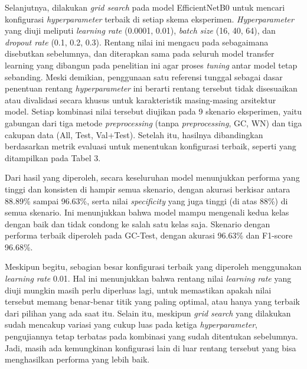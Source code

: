 Selanjutnya, dilakukan \textit{grid search} pada model EfficientNetB0 untuk mencari konfigurasi \textit{hyperparameter} terbaik di setiap skema eksperimen. \textit{Hyperparameter} yang diuji meliputi \textit{learning rate} (0.0001, 0.01), \textit{batch size} (16, 40, 64), dan \textit{dropout rate} (0.1, 0.2, 0.3). Rentang nilai ini mengacu pada \textcite{wojciuk2024improving} sebagaimana disebutkan sebelumnya, dan diterapkan sama pada seluruh model transfer learning yang dibangun pada penelitian ini agar proses \textit{tuning} antar model tetap sebanding. Meski demikian, penggunaan satu referensi tunggal sebagai dasar penentuan rentang \textit{hyperparameter} ini berarti rentang tersebut tidak disesuaikan atau divalidasi secara khusus untuk karakteristik masing-masing arsitektur model. Setiap kombinasi nilai tersebut diujikan pada 9 skenario eksperimen, yaitu gabungan dari tiga metode \textit{preprocessing} (tanpa \textit{preprocessing}, GC, WN) dan tiga cakupan data (All, Test, Val+Test). Setelah itu, hasilnya dibandingkan berdasarkan metrik evaluasi untuk menentukan konfigurasi terbaik, seperti yang ditampilkan pada Tabel 3.

Dari hasil yang diperoleh, secara keseluruhan model menunjukkan performa yang tinggi dan konsisten di hampir semua skenario, dengan akurasi berkisar antara 88.89\% sampai 96.63\%, serta nilai \textit{specificity} yang juga tinggi (di atas 88\%) di semua skenario. Ini menunjukkan bahwa model mampu mengenali kedua kelas dengan baik dan tidak condong ke salah satu kelas saja. Skenario dengan performa terbaik diperoleh pada GC-Test, dengan akurasi 96.63\% dan F1-score 96.68\%.

Meskipun begitu, sebagian besar konfigurasi terbaik yang diperoleh menggunakan \textit{learning rate} 0.01. Hal ini menunjukkan bahwa rentang nilai \textit{learning rate} yang diuji mungkin masih perlu diperluas lagi, untuk memastikan apakah nilai tersebut memang benar-benar titik yang paling optimal, atau hanya yang terbaik dari pilihan yang ada saat itu. Selain itu, meskipun \textit{grid search} yang dilakukan sudah mencakup variasi yang cukup luas pada ketiga \textit{hyperparameter}, pengujiannya tetap terbatas pada kombinasi yang sudah ditentukan sebelumnya. Jadi, masih ada kemungkinan konfigurasi lain di luar rentang tersebut yang bisa menghasilkan performa yang lebih baik.

